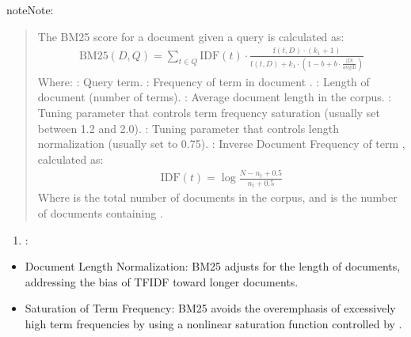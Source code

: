 \documentclass[letterpaper,11pt,english]{sphinxmanual}
\begin{document}
\begin{sphinxadmonition}{note}{Note:}
\begin{itemize}
\begin{quote}
\sphinxAtStartPar
The BM25 score for a document  given a query  is calculated as:
\begin{equation*}
\begin{split}\text{BM25}(D, Q) = \sum_{t \in Q} \text{IDF}(t) \cdot \frac{\text{f}(t, D) \cdot (k_1 + 1)}{\text{f}(t, D) + k_1 \cdot (1 - b + b \cdot \frac{|D|}{\text{avgdl}})}\end{split}
\end{equation*}
\sphinxAtStartPar
Where:
\sphinxhyphen{} : Query term.
\sphinxhyphen{} : Frequency of term  in document .
\sphinxhyphen{} : Length of document  (number of terms).
\sphinxhyphen{} : Average document length in the corpus.
\sphinxhyphen{} : Tuning parameter that controls term frequency saturation (usually set between 1.2 and 2.0).
\sphinxhyphen{} : Tuning parameter that controls length normalization (usually set to 0.75).
\sphinxhyphen{} : Inverse Document Frequency of term , calculated as:
\begin{equation*}
\begin{split}\text{IDF}(t) = \log \frac{N - n_t + 0.5}{n_t + 0.5}\end{split}
\end{equation*}
\sphinxAtStartPar
Where  is the total number of documents in the corpus, and  is the number of documents containing .
\end{quote}
\begin{enumerate}
%
\setcounter{enumi}{2}
\item {} 
\sphinxAtStartPar
{}:

\end{enumerate}
\begin{itemize}
\item {} 
\sphinxAtStartPar
Document Length Normalization: BM25 adjusts for the length of documents, addressing the bias of TF\sphinxhyphen{}IDF toward longer documents.

\item {} 
\sphinxAtStartPar
Saturation of Term Frequency: BM25 avoids the overemphasis of excessively high term frequencies by using a non\sphinxhyphen{}linear saturation function controlled by .


\end{itemize}
\end{itemize}
\end{sphinxadmonition}
\end{document}
